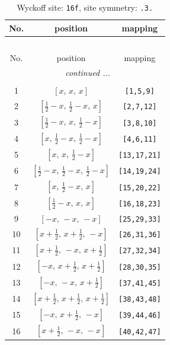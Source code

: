 \documentclass[fleqn,8pt]{jsarticle}
\begin{document}
\begin{longtable}{ccc}
\caption{Wyckoff site: {\tt 16f}, site symmetry: {\tt .3.}}
 \\
 \hline \hline
No. & position & mapping \\ \hline \endfirsthead

\multicolumn{2}{l}{\tablename\ \thetable{}} \\
 \hline \hline
No. & position & mapping \\ \hline \endhead

 \hline \hline
\multicolumn{2}{r}{\footnotesize\it continued ...} \\ \endfoot

 \hline \hline
\multicolumn{2}{r}{} \\ \endlastfoot

1 & $\left[ x,\, x,\, x \right]$ & {\tt [1,5,9]} \\ \hline
2 & $\left[ \frac{1}{2} - x,\, \frac{1}{2} - x,\, x \right]$ & {\tt [2,7,12]} \\ \hline
3 & $\left[ \frac{1}{2} - x,\, x,\, \frac{1}{2} - x \right]$ & {\tt [3,8,10]} \\ \hline
4 & $\left[ x,\, \frac{1}{2} - x,\, \frac{1}{2} - x \right]$ & {\tt [4,6,11]} \\ \hline
5 & $\left[ x,\, x,\, \frac{1}{2} - x \right]$ & {\tt [13,17,21]} \\ \hline
6 & $\left[ \frac{1}{2} - x,\, \frac{1}{2} - x,\, \frac{1}{2} - x \right]$ & {\tt [14,19,24]} \\ \hline
7 & $\left[ x,\, \frac{1}{2} - x,\, x \right]$ & {\tt [15,20,22]} \\ \hline
8 & $\left[ \frac{1}{2} - x,\, x,\, x \right]$ & {\tt [16,18,23]} \\ \hline
9 & $\left[ - x,\, - x,\, - x \right]$ & {\tt [25,29,33]} \\ \hline
10 & $\left[ x + \frac{1}{2},\, x + \frac{1}{2},\, - x \right]$ & {\tt [26,31,36]} \\ \hline
11 & $\left[ x + \frac{1}{2},\, - x,\, x + \frac{1}{2} \right]$ & {\tt [27,32,34]} \\ \hline
12 & $\left[ - x,\, x + \frac{1}{2},\, x + \frac{1}{2} \right]$ & {\tt [28,30,35]} \\ \hline
13 & $\left[ - x,\, - x,\, x + \frac{1}{2} \right]$ & {\tt [37,41,45]} \\ \hline
14 & $\left[ x + \frac{1}{2},\, x + \frac{1}{2},\, x + \frac{1}{2} \right]$ & {\tt [38,43,48]} \\ \hline
15 & $\left[ - x,\, x + \frac{1}{2},\, - x \right]$ & {\tt [39,44,46]} \\ \hline
16 & $\left[ x + \frac{1}{2},\, - x,\, - x \right]$ & {\tt [40,42,47]} \\
\end{longtable}
\end{document}
